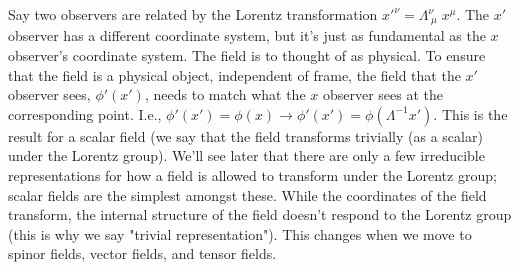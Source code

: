 \noindent Say two observers are related by the Lorentz transformation $x'^\nu = \Lambda^\nu_{\;\mu}\;x^\mu$. The $x'$ observer has a different coordinate system, but it's just as fundamental as the $x$ observer's coordinate system. The field is to thought of as physical. To ensure that the field is a physical object, independent of frame, the field that the $x'$ observer sees, $\phi'(x')$, needs to match what the $x$ observer sees at the corresponding point. I.e., $\phi'(x') = \phi(x) \rightarrow \phi'(x') = \phi(\Lambda^{-1}x')$. This is the result for a scalar field (we say that the field transforms trivially (as a scalar) under the Lorentz group). We'll see later that there are only a few irreducible representations for how a field is allowed to transform under the Lorentz group; scalar fields are the simplest amongst these. While the coordinates of the field transform, the internal structure of the field doesn't respond to the Lorentz group (this is why we say "trivial representation"). This changes when we move to spinor fields, vector fields, and tensor fields.
